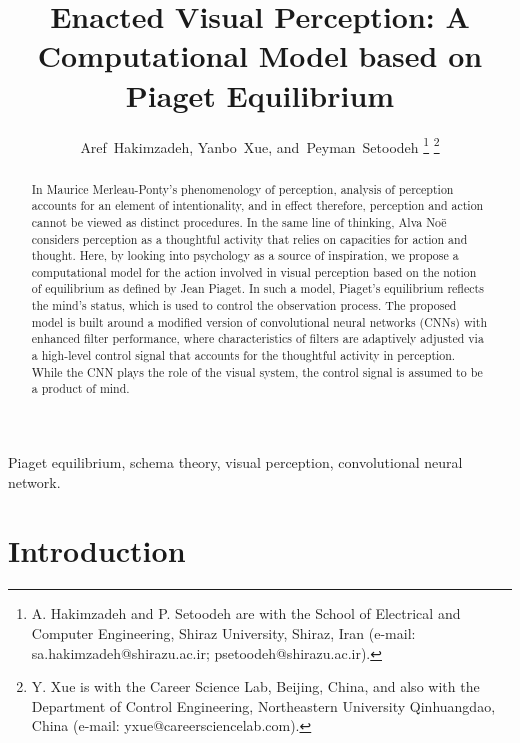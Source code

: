 \documentclass[journal]{IEEEtran}
\begin{document}
\title{Enacted Visual Perception: A Computational Model based on Piaget Equilibrium}

\author{Aref~Hakimzadeh,  
        Yanbo~Xue, 
        and~Peyman~Setoodeh
\thanks{A. Hakimzadeh and P. Setoodeh are with the School
of Electrical and Computer Engineering, Shiraz University, Shiraz,
Iran (e-mail: sa.hakimzadeh@shirazu.ac.ir; psetoodeh@shirazu.ac.ir).}
\thanks{Y. Xue is with the Career Science Lab, Beijing, China, and also with the Department of Control Engineering, Northeastern University 
Qinhuangdao, China (e-mail: yxue@careersciencelab.com).}
}


\maketitle

\begin{abstract}
In Maurice Merleau-Ponty's phenomenology of perception, analysis of perception accounts for an element of intentionality, and in effect therefore, perception and action cannot be viewed as distinct procedures. In the same line of thinking, Alva No\"{e} considers perception as a thoughtful activity that relies on capacities for action and thought. Here, by looking into psychology as a source of inspiration, we propose a computational model for the action involved in visual perception based on the notion of equilibrium as defined by Jean Piaget. In such a model, Piaget's equilibrium reflects the mind's status, which is used to control the observation process. The proposed model is built around a modified version of convolutional neural networks (CNNs) with enhanced filter performance, where characteristics of filters are adaptively adjusted via a high-level control signal that accounts for the thoughtful activity in perception. While the CNN plays the role of the visual system, the control signal is assumed to be a product of mind.
\end{abstract}

\begin{IEEEkeywords}
Piaget equilibrium, schema theory, visual perception, convolutional neural network.
\end{IEEEkeywords}



\section{Introduction}
\end{document}
